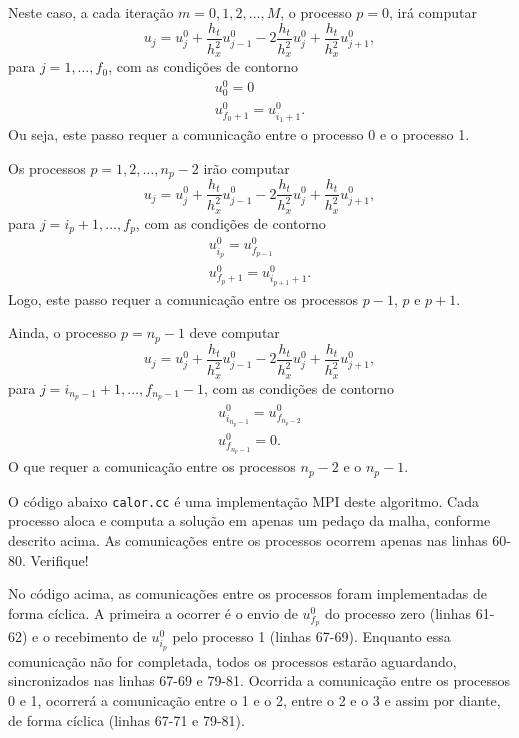 Neste caso, a cada iteração $m=0,1,2,\ldots, M$, o processo $p=0$, irá computar
\begin{equation}
  u_j = u^0_j + \frac{h_t}{h_x^2}u^0_{j-1} - 2\frac{h_t}{h_x^2}u^0_{j} + \frac{h_t}{h_x^2}u^0_{j+1},
\end{equation}
para $j=1,\dotsc,f_0$, com as condições de contorno
\begin{gather}
  u^0_0 = 0\\
  u^0_{f_0+1} = u^0_{i_1+1}.
\end{gather}
Ou seja, este passo requer a comunicação entre o processo 0 e o processo 1.

Os processos $p=1,2,\dotsc,n_p-2$ irão computar
\begin{equation}
  u_j = u^0_j + \frac{h_t}{h_x^2}u^0_{j-1} - 2\frac{h_t}{h_x^2}u^0_{j} + \frac{h_t}{h_x^2}u^0_{j+1},
\end{equation}
para $j=i_p+1,\dotsc, f_p$, com as condições de contorno
\begin{gather}
  u^0_{i_p} = u^0_{f_{p-1}}\\
  u^0_{f_p+1} = u^0_{i_{p+1}+1}.
\end{gather}
Logo, este passo requer a comunicação entre os processos $p-1$, $p$ e $p+1$.

Ainda, o processo $p=n_p-1$ deve computar
\begin{equation}
  u_j = u^0_j + \frac{h_t}{h_x^2}u^0_{j-1} - 2\frac{h_t}{h_x^2}u^0_{j} + \frac{h_t}{h_x^2}u^0_{j+1},
\end{equation}
para $j=i_{n_p-1}+1,\dotsc, f_{n_p-1}-1$, com as condições de contorno
\begin{gather}
  u^0_{i_{n_p-1}} = u^0_{f_{n_p-2}}\\
  u^0_{f_{n_p-1}} = 0.
\end{gather}
O que requer a comunicação entre os processos $n_p-2$ e o $n_p-1$.

O código abaixo \verb+calor.cc+ é uma implementação MPI deste algoritmo. Cada processo aloca e computa a solução em apenas um pedaço da malha, conforme descrito acima. As comunicações entre os processos ocorrem apenas nas linhas 60-80. Verifique!



No código acima, as comunicações entre os processos foram implementadas de forma cíclica. A primeira a ocorrer é o envio de $u^0_{f_p}$ do processo zero (linhas 61-62) e o recebimento de $u^0_{i_p}$ pelo processo 1 (linhas 67-69). Enquanto essa comunicação não for completada, todos os processos estarão aguardando, sincronizados nas linhas 67-69 e 79-81. Ocorrida a comunicação entre os processos 0 e 1, ocorrerá a comunicação entre o 1 e o 2, entre o 2 e o 3 e assim por diante, de forma cíclica (linhas 67-71 e 79-81).

